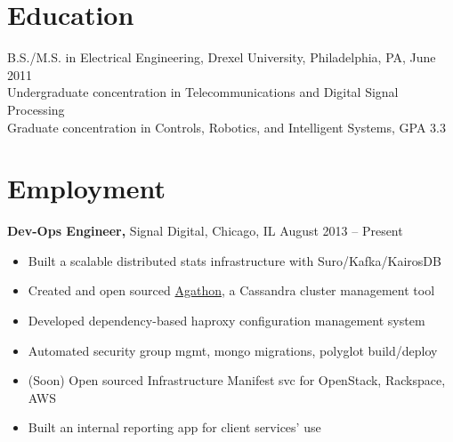 \documentclass[margin]{res}
\begin{document}
 
 
 
\address{{\bf Present Address} \\ 5645 W 63rd Place \\ Chicago, IL 60638  \\
        (215) 501-7891 }
\address{{\bf Permanent Address} \\ 1726 Reyburn Creek Road \\ Malvern, AR 72104 \\
        (501) 337-8485 }

\begin{resume} 


\section{Education} 
B.S./M.S. in Electrical Engineering, Drexel University, Philadelphia, PA, June 2011 \\
Undergraduate concentration in Telecommunications and Digital Signal Processing \\
Graduate concentration in Controls, Robotics, and Intelligent Systems, GPA 3.3 

\section{Employment}
 {\bf Dev-Ops Engineer,} Signal Digital, Chicago, IL \hfill August 2013 -- Present
 \begin{itemize} \itemsep -2pt  %
  \item Built a scalable distributed stats infrastructure with Suro/Kafka/KairosDB
  \item Created and open sourced \href{https://github.com/brighttag/agathon}{Agathon}, a Cassandra cluster management tool
  \item Developed dependency-based haproxy configuration management system
  \item Automated security group mgmt, mongo migrations, polyglot build/deploy
  \item (Soon) Open sourced Infrastructure Manifest svc for OpenStack, Rackspace, AWS
  \item Built an internal reporting app for client services' use
 \end{itemize}


\end{resume}
\end{document}
